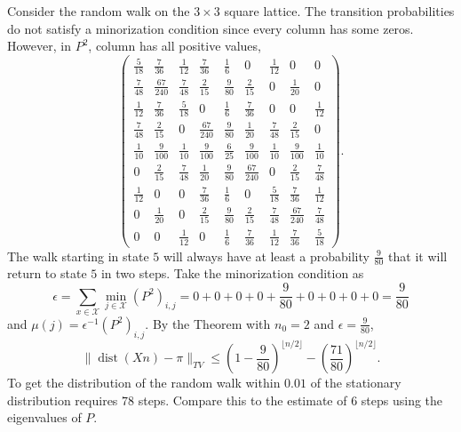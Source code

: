 \documentclass[12pt]{article}
\begin{document}
\begin{example}
    Consider the random walk on the \( 3 \times 3 \) square lattice. The
    transition probabilities do not satisfy a minorization condition
    since every column has some zeros.  However, in \( P^2 \), column
    has all positive values,
    \[
        \begin{pmatrix}
            \frac{5}{18} & \frac{7}{36} & \frac{1}{12} & \frac{7}{36} &
            \frac{1}{6} & 0 & \frac{1}{12} & 0 & 0\\
            \frac{7}{48} & \frac{67}{240} & \frac{7}{48} & \frac{2}{15}
            & \frac{9}{80} & \frac{2}{15} & 0 & \frac{1}{20} & 0\\
            \frac{1}{12} & \frac{7}{36} & \frac{5}{18} & 0 & \frac{1}{6}
            & \frac{7}{36} & 0 & 0 & \frac{1}{12}\\
            \frac{7}{48} & \frac{2}{15} & 0 & \frac{67}{240} & \frac{9}{80}
            & \frac{1}{20} & \frac{7}{48} & \frac{2}{15} & 0\\
            \frac{1}{10} & \frac{9}{100} & \frac{1}{10} & \frac{9}{100}
            & \frac{6}{25} & \frac{9}{100} & \frac{1}{10} & \frac{9}{100}
            & \frac{1}{10}\\
            0 & \frac{2}{15} & \frac{7}{48} & \frac{1}{20} & \frac{9}{80}
            & \frac{67}{240} & 0 & \frac{2}{15} & \frac{7}{48}\\
            \frac{1}{12} & 0 & 0 & \frac{7}{36} & \frac{1}{6} & 0 &
            \frac{5}{18} & \frac{7}{36} & \frac{1}{12}\\
            0 & \frac{1}{20} & 0 & \frac{2}{15} & \frac{9}{80} & \frac{2}
            {15} & \frac{7}{48} & \frac{67}{240} & \frac{7}{48}\\
            0 & 0 & \frac{1}{12} & 0 & \frac{1}{6} & \frac{7}{36} &
            \frac{1}{12} & \frac{7}{36} & \frac{5}{18}
        \end{pmatrix}
        .
    \] The walk starting in state \( 5 \) will always have at least a
    probability \( \frac{9}{80} \) that it will return to state \( 5 \)
    in two steps.  Take the minorization condition as
    \[
        \epsilon = \sum_{x \in \mathcal{X}} \min_{j \in \mathcal{X}} (P^2)_
        {i,j} = 0 + 0 + 0 + 0 + \frac{9}{80} + 0 + 0 + 0 + 0 = \frac{9}{80}
    \] and \( \mu(j) = \epsilon^{-1} (P^2)_{i,j} \).  By the Theorem
    with \( n_0 = 2 \) and \( \epsilon = \frac{9}{80} \),
    \[
        \|
        \operatorname{dist}
        (Xn) - \pi \|_{TV} \le (1-\frac{9}{80})^{\lfloor n/2 \rfloor} -
        \left( \frac{71}{80} \right)^{\lfloor n/2 \rfloor}.
    \] To get the distribution of the random walk within \( 0.01 \) of
    the stationary distribution requires \( 78 \) steps.  Compare this
    to the estimate of \( 6 \) steps using the eigenvalues of \( P \).
\end{example}
\end{document}

